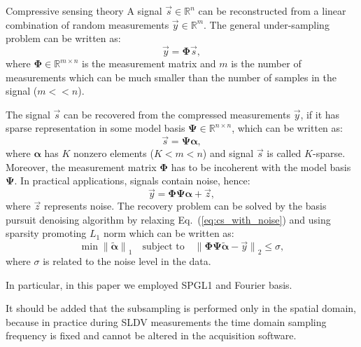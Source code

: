 \documentclass[10pt,aspectratio=169,dvipsnames]{beamer} %
\newcommand{\bs}[1]{\boldsymbol{#1}}
\begin{document}
	\begin{frame}{Compressive sensing theory}
		\tiny
		A signal $\vec{s}\in \mathbb{R}^n$ can be reconstructed from a linear combination of random measurements $\vec{y} \in \mathbb{R}^m$.
		The general under-sampling problem can be written as:
		\begin{equation}
			\vec{y} = \bs{\Phi} \vec{s},
		\end{equation}
		where $\bs{\Phi} \in \mathbb{R}^{m\times n}$ is the measurement matrix and $m$ is the number of measurements which can be much smaller than the number of samples in the signal ($m<<n$).
		
		The signal $\vec{s}$ can be recovered from the compressed measurements $\vec{y}$, if it has sparse representation in some model basis $\bs{\Psi} \in \mathbb{R}^{n\times n}$, which can be written as:
		\begin{equation}
			\vec{s} = \bs{\Psi} \bs{\alpha},
		\end{equation}
		where $\bs{\alpha}$ has $K$ nonzero elements ($K<m<n$) and signal $\vec{s}$ is called $K$-sparse. 
		Moreover, the measurement matrix $\bs{\Phi}$ has to be incoherent with the model basis $\bs{\Psi}$.
		In practical applications, signals contain noise, hence:
		\begin{equation}
			\vec{y} = \bs{\Phi} \bs{\Psi} \bs{\alpha} + \vec{z},
			\label{eq:cs_with_noise}
		\end{equation}
		where $\vec{z}$ represents noise.
		The recovery problem can be solved by the basis pursuit denoising algorithm by relaxing Eq.~(\ref{eq:cs_with_noise}) and using sparsity promoting $L_1$ norm which can be written as:
		\begin{equation}
			\min{\lVert \tilde{\bs{\alpha}} \rVert}_1 \quad \textrm{subject to} \quad {\lVert \bs{\Phi} \bs{\Psi} \tilde{\bs{\alpha}} -\vec{y} \rVert}_2 \leq \sigma ,
		\end{equation}
		where $\sigma$ is related to the noise level in the data.
		
		In particular, in this paper we employed SPGL1 and Fourier basis.
		
		It should be added that the subsampling is performed only in the spatial domain, because in practice during SLDV measurements the time domain sampling frequency is fixed and cannot be altered in the acquisition software. 	
	\end{frame}
	
\end{document}
